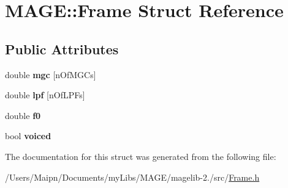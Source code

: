 \hypertarget{struct_m_a_g_e_1_1_frame}{\section{M\-A\-G\-E\-:\-:Frame Struct Reference}
\label{struct_m_a_g_e_1_1_frame}
}
\subsection*{Public Attributes}
\begin{DoxyCompactItemize}
\item 
\hypertarget{struct_m_a_g_e_1_1_frame_acb7d2f554e9ae0d63f0bcad3a5450c3d}{double {\bfseries mgc} \mbox{[}n\-Of\-M\-G\-Cs\mbox{]}}\label{struct_m_a_g_e_1_1_frame_acb7d2f554e9ae0d63f0bcad3a5450c3d}

\item 
\hypertarget{struct_m_a_g_e_1_1_frame_aeaab3d1d1d46a336225af11f43583c1f}{double {\bfseries lpf} \mbox{[}n\-Of\-L\-P\-Fs\mbox{]}}\label{struct_m_a_g_e_1_1_frame_aeaab3d1d1d46a336225af11f43583c1f}

\item 
\hypertarget{struct_m_a_g_e_1_1_frame_a22ebe115d2e0d1f1ceb0570042d10f34}{double {\bfseries f0}}\label{struct_m_a_g_e_1_1_frame_a22ebe115d2e0d1f1ceb0570042d10f34}

\item 
\hypertarget{struct_m_a_g_e_1_1_frame_a7d0bff085a85c0cf4b6a5fc1eaf2827f}{bool {\bfseries voiced}}\label{struct_m_a_g_e_1_1_frame_a7d0bff085a85c0cf4b6a5fc1eaf2827f}

\end{DoxyCompactItemize}


The documentation for this struct was generated from the following file\-:\begin{DoxyCompactItemize}
\item 
/\-Users/\-Maipn/\-Documents/my\-Libs/\-M\-A\-G\-E/magelib-\/2./src/\hyperlink{_frame_8h}{Frame.\-h}\end{DoxyCompactItemize}
